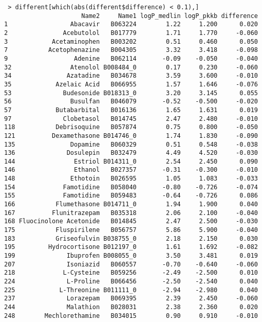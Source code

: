 \begin{verbatim}
 > different[which(abs(different$difference) < 0.1),]
                     Name2     Name1 logP_medlin logP_pkkb difference
1                 Abacavir   B063224        1.22     1.200      0.020
2               Acebutolol   B017779        1.71     1.770     -0.060
3            Acetaminophen   B003202        0.51     0.460      0.050
7           Acetophenazine   B004305        3.32     3.418     -0.098
9                  Adenine   B062114       -0.09    -0.050     -0.040
32                Atenolol B008484_0        0.17     0.230     -0.060
34               Azatadine   B034678        3.59     3.600     -0.010
35            Azelaic Acid   B066955        1.57     1.646     -0.076
53              Budesonide B018313_0        3.20     3.145      0.055
56                Busulfan   B046079       -0.52    -0.500     -0.020
57            Butabarbital   B016136        1.65     1.631      0.019
97              Clobetasol   B014745        2.47     2.480     -0.010
118           Debrisoquine   B057874        0.75     0.800     -0.050
121          Dexamethasone B014746_0        1.74     1.830     -0.090
135               Dopamine   B060329        0.51     0.548     -0.038
136              Dosulepin   B032479        4.49     4.520     -0.030
144                Estriol B014311_0        2.54     2.450      0.090
146                Ethanol   B027357       -0.31    -0.300     -0.010
148               Ethotoin   B026595        1.05     1.083     -0.033
154             Famotidine   B058040       -0.80    -0.726     -0.074
155             Famotidine   B059483       -0.64    -0.726      0.086
166           Flumethasone B014711_0        1.94     1.900      0.040
167          Flunitrazepam   B035318        2.06     2.100     -0.040
168 Fluocinolone Acetonide   B014845        2.47     2.500     -0.030
175           Fluspirilene   B056757        5.86     5.900     -0.040
183           Griseofulvin B038755_0        2.18     2.150      0.030
195         Hydrocortisone B012197_0        1.61     1.692     -0.082
199              Ibuprofen B008055_0        3.50     3.481      0.019
207              Isoniazid   B060557       -0.70    -0.640     -0.060
218             L-Cysteine   B059256       -2.49    -2.500      0.010
224              L-Proline   B066456       -2.50    -2.540      0.040
225            L-Threonine B011111_0       -2.94    -2.980      0.040
237              Lorazepam   B069395        2.39     2.450     -0.060
244              Malathion   B028031        2.38     2.360      0.020
248        Mechlorethamine   B034015        0.90     0.910     -0.010

\end{verbatim}
